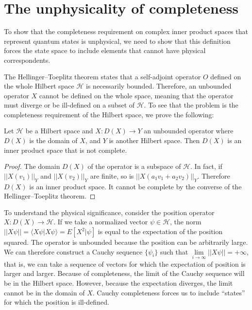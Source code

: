 \documentclass[10pt,twocolumn, nofootinbib]{revtex4-2}
\def\>{\rangle}
\def\<{\langle}
\begin{document}
\section{The unphysicality of completeness}

To show that the completeness requirement on complex inner product spaces that represent quantum states is unphysical, we need to show that this definition forces the state space to include elements that cannot have physical correspondents.

The Hellinger–Toeplitz theorem states that a self-adjoint operator $O$ defined on the whole Hilbert space $\mathcal{H}$ is necessarily bounded. Therefore, an unbounded operator $X$ cannot be defined on the whole space, meaning that the operator must diverge or be ill-defined on a subset of $\mathcal{H}$. To see that the problem is the completeness requirement of the Hilbert space, we prove the following:
\begin{prop}
Let $\mathcal{H}$ be a Hilbert space and $X : D(X) \to Y$ an unbounded operator where $D(X)$ is the domain of $X$, and $Y$ is another Hilbert space. Then $D(X)$ is an inner product space that is not complete.
\end{prop}
\begin{proof}
The domain $D(X)$ of the operator is a subspace of $\mathcal{H}$. In fact, if $||X(v_1)||_Y$ and $||X(v_2)||_Y$ are finite, so is $||X(a_1 v_1+a_2v_2)||_Y$. Therefore $D(X)$ is an inner product space. It cannot be complete by the converse of the Hellinger–Toeplitz theorem.
\end{proof}

To understand the physical significance, consider the position operator $X : D(X) \to \mathcal{H}$. If we take a normalized vector $\psi \in \mathcal{H}$, the norm $||X\psi|| = \<X\psi|X\psi\> = E[X^2|\psi]$ is equal to the expectation of the position squared. The operator is unbounded because the position can be arbitrarily large. We can therefore construct a Cauchy sequence $\{\psi_i\}$ such that $\lim\limits_{i \to \infty}||X\psi|| = +\infty$, that is, we can take a sequence of vectors for which the expectation of position is larger and larger. Because of completeness, the limit of the Cauchy sequence will be in the Hilbert space. However, because the expectation diverges, the limit cannot be in the domain of $X$. Cauchy completeness forces us to include ``states'' for which the position is ill-defined.
\end{document}
